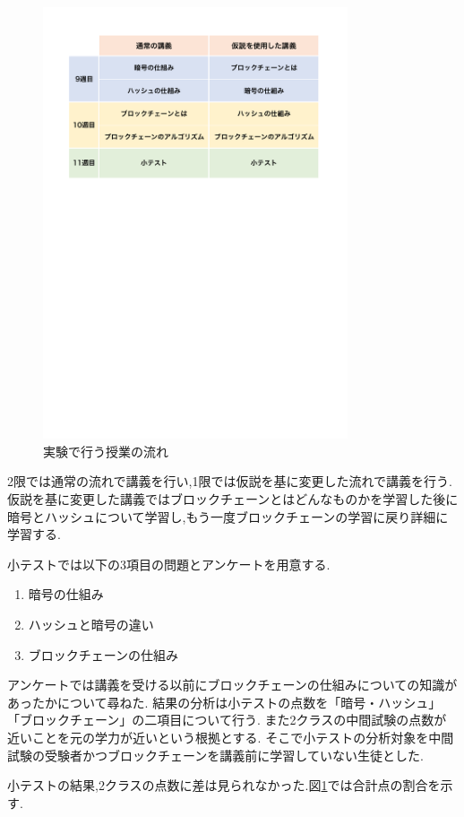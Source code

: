\documentclass[twocolumn,10pt,a4j]{jsarticle}
\begin{document}
\begin{figure}[H]
\centering
\includegraphics[mediaboxonly=/CropBox,width=9cm]{timeline.pdf}
\caption{実験で行う授業の流れ}
\label{fig:time}
\end{figure}
2限では通常の流れで講義を行い,1限では仮説を基に変更した流れで講義を行う.
仮説を基に変更した講義ではブロックチェーンとはどんなものかを学習した後に暗号とハッシュについて学習し,もう一度ブロックチェーンの学習に戻り詳細に学習する.


小テストでは以下の3項目の問題とアンケートを用意する.
\begin{enumerate}
\renewcommand {\labelenumi}{(\arabic{enumi})}
\item 暗号の仕組み
\item ハッシュと暗号の違い
\item ブロックチェーンの仕組み
\end{enumerate}

アンケートでは講義を受ける以前にブロックチェーンの仕組みについての知識があったかについて尋ねた.
結果の分析は小テストの点数を「暗号・ハッシュ」「ブロックチェーン」の二項目について行う.
また2クラスの中間試験の点数が近いことを元の学力が近いという根拠とする.
そこで小テストの分析対象を中間試験の受験者かつブロックチェーンを講義前に学習していない生徒とした.

小テストの結果,2クラスの点数に差は見られなかった.図\ref{fig:time}では合計点の割合を示す.
\end{document}

